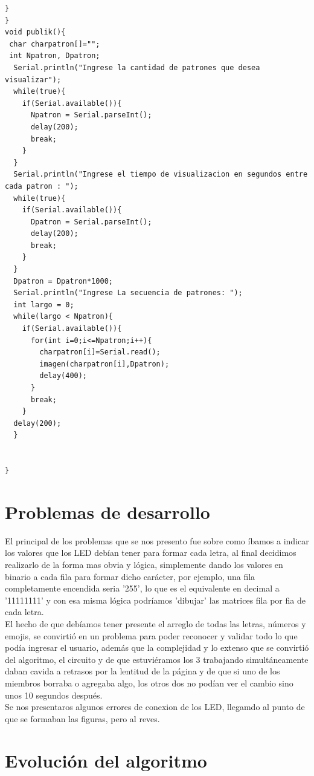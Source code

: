 \documentclass{article}
\begin{document}
\begin{lstlisting}[style=myArduino]
  }
}
void publik(){
 char charpatron[]="";
 int Npatron, Dpatron;
  Serial.println("Ingrese la cantidad de patrones que desea visualizar");
  while(true){
    if(Serial.available()){
  	  Npatron = Serial.parseInt();
      delay(200);
      break;
    }
  }
  Serial.println("Ingrese el tiempo de visualizacion en segundos entre cada patron : ");
  while(true){
    if(Serial.available()){
  	  Dpatron = Serial.parseInt();
      delay(200);
      break;
    }
  }
  Dpatron = Dpatron*1000;
  Serial.println("Ingrese La secuencia de patrones: ");
  int largo = 0;
  while(largo < Npatron){
    if(Serial.available()){
      for(int i=0;i<=Npatron;i++){
        charpatron[i]=Serial.read();
        imagen(charpatron[i],Dpatron);
        delay(400);
      }
      break;
    }
  delay(200);
  }
 
  
}
\end{lstlisting}

\section{Problemas de desarrollo} \label{conclulsion}
El principal de los problemas que se nos presento fue sobre como íbamos a indicar los valores que los LED debían tener para formar cada letra, al final decidimos realizarlo de la forma mas obvia y lógica, simplemente dando los valores en binario a cada fila para formar dicho carácter, por ejemplo, una fila completamente encendida seria '255', lo que es el equivalente en decimal a '11111111' y con esa misma lógica podríamos  'dibujar' las matrices fila por fia de cada letra. \\


El hecho de que debíamos tener presente el arreglo de todas las letras, números y emojis, se convirtió en un problema para poder reconocer y validar todo lo que podía ingresar el usuario, además que la complejidad y lo extenso que se convirtió del algoritmo, el circuito y de que estuviéramos los 3 trabajando simultáneamente daban cavida a retrasos por la lentitud de la página y de que si uno de los miembros borraba o agregaba algo, los otros dos no podían ver el cambio sino unos 10 segundos después.\\

Se nos presentaros algunos errores de conexion de los LED, llegamdo al punto de que se formaban las figuras, pero al reves.\\


\section{Evolución del algoritmo} \label{conclulsion}
\end{document}
